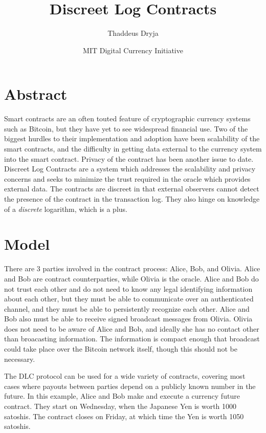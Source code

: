 \documentclass[11pt]{article}
\title{\textbf{Discreet Log Contracts}}
\author{Thaddeus Dryja}
\date{MIT Digital Currency Initiative}
\begin{document}
\maketitle

\section*{Abstract}

Smart contracts \cite{szabo1997formalizing} are an often touted feature of cryptographic currency systems such as Bitcoin, but they have yet to see widespread financial use.  Two of the biggest hurdles to their implementation and adoption have been scalability of the smart contracts, and the difficulty in getting data external to the currency system into the smart contract.  Privacy of the contract has been another issue to date.  Discreet Log Contracts are a system which addresses the scalability and privacy concerns and seeks to minimize the trust required in the oracle which provides external data.  The contracts are discreet in that external observers cannot detect the presence of the contract in the transaction log.  They also hinge on knowledge of a \textit{discrete} logarithm, which is a plus.


\section*{Model}

There are 3 parties involved in the contract process: Alice, Bob, and Olivia.  Alice and Bob are contract counterparties, while Olivia is the oracle.  Alice and Bob do not trust each other and do not need to know any legal identifying information about each other, but they must be able to communicate over an authenticated channel, and they must be able to persistently recognize each other.  Alice and Bob also must be able to receive signed broadcast messages from Olivia.  Olivia does not need to be aware of Alice and Bob, and ideally she has no contact other than broacasting information.  The information is compact enough that broadcast could take place over the Bitcoin network itself, though this should not be necessary.

The DLC protocol can be used for a wide variety of contracts, covering most cases where payouts between parties depend on a publicly known number in the future.  In this example, Alice and Bob make and execute a currency future contract.  They start on Wednesday, when the Japanese Yen is worth 1000 satoshis.  The contract closes on Friday, at which time the Yen is worth 1050 satoshis.
\end{document}
